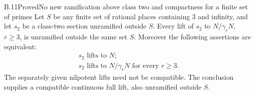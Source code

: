 \begin{statement}{B.11}{Proved}{No new ramification above class two and compactness for a finite set of primes}
Let $S$ be any finite set of rational places containing
$3$ and infinity, and let $s_2$ be a class-two section
unramified outside $S$.  Every lift of $s_2$ to
$N/\gamma_rN$, $r\ge3$, is unramified outside the same
set $S$.  Moreover the following assertions are equivalent:
\[
 \begin{gathered}
 s_2\text{ lifts to }N;\\
 s_2\text{ lifts to }N/\gamma_rN\text{ for every }r\ge3.
 \end{gathered}                                               \tag{B.11.1}
\]
The separately given nilpotent lifts need not be
compatible.  The conclusion supplies a compatible
continuous full lift, also unramified outside $S$.
\end{statement}
